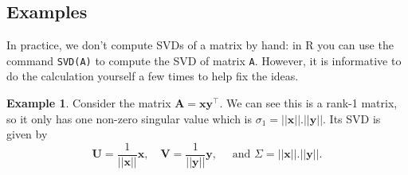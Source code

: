 \documentclass[
]{book}
\theoremstyle{definition}
\theoremstyle{definition}
\newtheorem{example}{Example}[chapter]
\theoremstyle{definition}
\theoremstyle{definition}
\theoremstyle{remark}
\begin{document}
\subsection{Examples}\label{examples}

In practice, we don't compute SVDs of a matrix by hand: in R you can use the command \texttt{SVD(A)} to compute the SVD of matrix \texttt{A}. However, it is informative to do the calculation yourself a few times to help fix the ideas.

\begin{example}
\protect\hypertarget{exm:svd1}{}\label{exm:svd1}Consider the matrix \(\mathbf A= \mathbf x\mathbf y^\top\). We can see this is a rank-1 matrix, so it only has one non-zero singular value which is \(\sigma_1 = ||\mathbf x||.||\mathbf y||\). Its SVD is given by
\[\mathbf U= \frac{1}{||\mathbf x|| }\mathbf x,\quad \mathbf V= \frac{1}{||\mathbf y|| }\mathbf y, \quad \mbox{ and } \Sigma =  ||\mathbf x||.||\mathbf y||.\]
\end{example}
\end{document}
